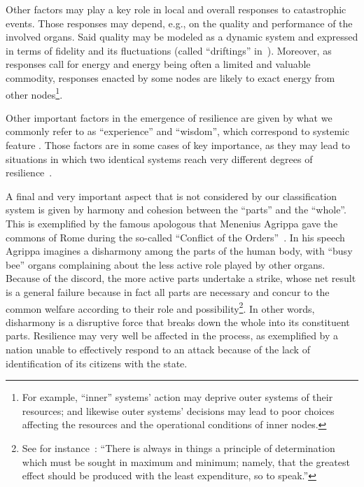 \documentclass[twocolumn]{svjour3}
\def\K{\hbox{}}
\begin{document}
Other factors may play a key role in local and overall responses to catastrophic events.
Those responses may depend, e.g., on the quality and performance of the involved organs. Said quality 
may be modeled as a dynamic system and expressed in terms of fidelity and its fluctuations
(called ``driftings'' in~\cite{DBLP:journals/corr/FlorioP15,DF14a}).
Moreover, as responses call for energy and energy being often a limited and valuable commodity, responses
enacted by some nodes are likely to exact energy from other nodes\footnote{For
	example, ``inner'' systems' action may deprive outer systems of their resources;
	and likewise outer systems' decisions may lead to poor 
	choices affecting the resources and the operational conditions of inner nodes.}.

Other important factors in the emergence of resilience
are given by what we commonly refer to as ``experience'' and ``wisdom'', which
correspond to systemic feature \K. Those factors are in some cases of key importance,
as they may lead to situations in which two identical systems reach very different degrees
of resilience~\cite{Washburn15}.

A final and very important aspect that is not considered by our classification system is given
by harmony and cohesion between the ``parts'' and the ``whole''. This is exemplified by the famous
apologous that Menenius Agrippa gave the commons of Rome during the so-called ``Conflict of the Orders''~\cite{Lily}.
In his speech Agrippa imagines a disharmony among the parts of the human body, with ``busy bee'' organs
complaining about the less active role played by other organs. Because of the discord,
the more active parts undertake a strike, whose net result is a general failure because in fact
all parts are necessary and
concur to the common welfare according to their role and possibility\footnote{See
	for instance~\cite{leibniz2006shorter}:
	``There
	is always in things a principle of determination which
	must be sought in maximum and minimum; namely, that
	the greatest effect should be produced with the least
	expenditure, so to speak.''}.
In other words, disharmony is a disruptive
force that breaks down the whole into its constituent parts. Resilience may very well be affected
in the process, as exemplified by a nation unable to effectively respond to an attack because of the lack
of identification of its citizens with the state.
\end{document}
